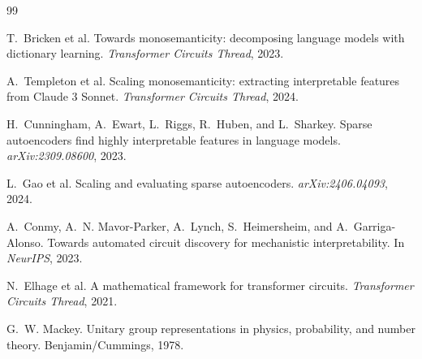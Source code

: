 \documentclass{article}
\begin{document}
\begin{thebibliography}{99}

T.~Bricken et al.
\newblock Towards monosemanticity: decomposing language models with
  dictionary learning.
\newblock \emph{Transformer Circuits Thread}, 2023.

A.~Templeton et al.
\newblock Scaling monosemanticity: extracting interpretable features from
  Claude 3 Sonnet.
\newblock \emph{Transformer Circuits Thread}, 2024.

H.~Cunningham, A.~Ewart, L.~Riggs, R.~Huben, and L.~Sharkey.
\newblock Sparse autoencoders find highly interpretable features in language
  models.
\newblock \emph{arXiv:2309.08600}, 2023.

L.~Gao et al.
\newblock Scaling and evaluating sparse autoencoders.
\newblock \emph{arXiv:2406.04093}, 2024.

A.~Conmy, A.~N. Mavor-Parker, A.~Lynch, S.~Heimersheim, and A.~Garriga-Alonso.
\newblock Towards automated circuit discovery for mechanistic interpretability.
\newblock In \emph{NeurIPS}, 2023.

N.~Elhage et al.
\newblock A mathematical framework for transformer circuits.
\newblock \emph{Transformer Circuits Thread}, 2021.

G.~W. Mackey.
\newblock Unitary group representations in physics, probability, and number
  theory.
\newblock Benjamin/Cummings, 1978.

\end{thebibliography}
\end{document}
